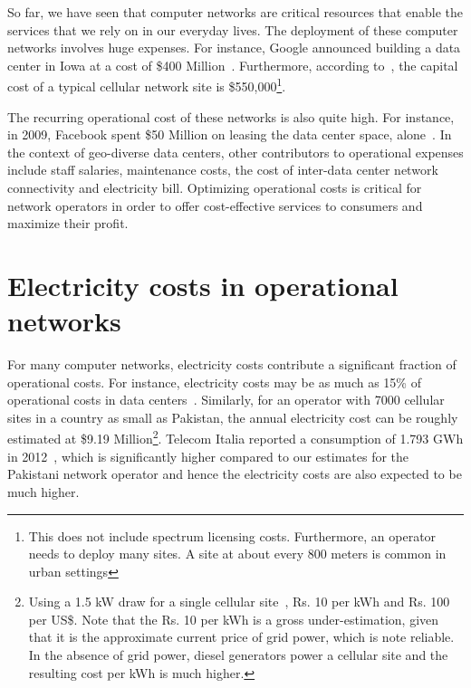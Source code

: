So far, we have seen that computer networks are critical resources that enable the services that we rely on in our everyday lives. The deployment of these computer networks involves huge expenses. For instance, Google announced building a data center in Iowa at a cost of \$400 Million~\cite{CostOfADC}. Furthermore, according to~\cite{costcellsite}, the capital cost of a typical cellular network site is \$550,000\footnote{This does not include spectrum licensing costs. Furthermore, an operator needs to deploy many sites. A site at about every 800 meters is common in urban settings}. 

The recurring operational cost of these networks is also quite high. For instance, in 2009, Facebook spent \$50 Million on leasing the data center space, alone~\cite{FBLease}. In the context of geo-diverse data centers, other contributors to operational expenses include staff salaries, maintenance costs, the cost of inter-data center network connectivity and electricity bill. Optimizing operational costs is critical for network operators in order to offer cost-effective services to consumers and maximize their profit.

\section{Electricity costs in operational networks} 
For many computer networks, electricity costs contribute a significant fraction of operational costs. For instance, electricity costs may be as much as 15\% of operational costs in data centers~\cite{costCloud}. Similarly, for an operator with 7000 cellular sites in a country as small as Pakistan, the annual electricity cost can be roughly estimated at \$9.19 Million\footnote{Using a 1.5 kW draw for a single cellular site~\cite{mbakwe:btshybribpower:2011:necec}, Rs. 10 per kWh and Rs. 100 per US\$. Note that the Rs. 10 per kWh is a gross under-estimation, given that it is the approximate current price of grid power, which is note reliable. In the absence of grid power, diesel generators power a cellular site and the resulting cost per kWh is much higher.}. Telecom Italia reported a consumption of 1.793 GWh in 2012~\cite{TIAnnualReport}, which is significantly higher compared to our estimates for the Pakistani network operator and hence the electricity costs are also expected to be much higher. 

